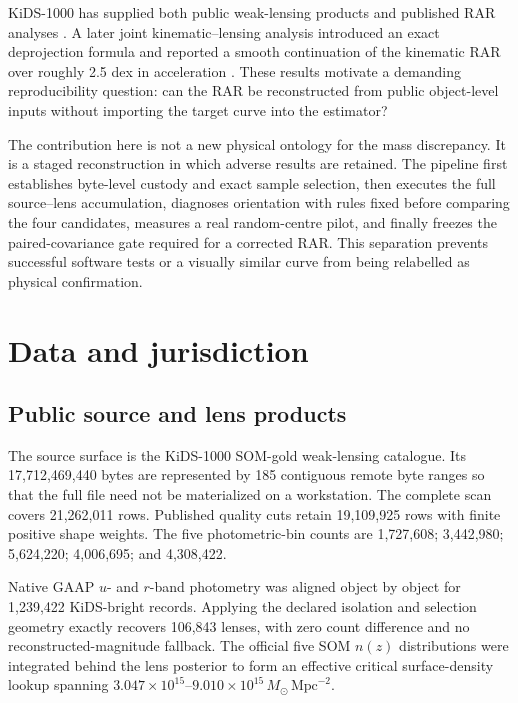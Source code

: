 \documentclass[11pt]{article}
\begin{document}
KiDS-1000 has supplied both public weak-lensing products and published RAR
analyses \citep{Kuijken2019,Wright2020,Brouwer2021}. A later joint
kinematic--lensing analysis introduced an exact deprojection formula and
reported a smooth continuation of the kinematic RAR over roughly 2.5 dex in
acceleration \citep{Mistele2024}. These results motivate a demanding
reproducibility question: can the RAR be reconstructed from public object-level
inputs without importing the target curve into the estimator?

The contribution here is not a new physical ontology for the mass discrepancy.
It is a staged reconstruction in which adverse results are retained. The
pipeline first establishes byte-level custody and exact sample selection, then
executes the full source--lens accumulation, diagnoses orientation with rules
fixed before comparing the four candidates, measures a real random-centre
pilot, and finally freezes the paired-covariance gate required for a corrected
RAR. This separation prevents successful software tests or a visually similar
curve from being relabelled as physical confirmation.

\section{Data and jurisdiction}

\subsection{Public source and lens products}

The source surface is the KiDS-1000 SOM-gold weak-lensing catalogue. Its
17,712,469,440 bytes are represented by 185 contiguous remote byte ranges so
that the full file need not be materialized on a workstation. The complete
scan covers 21,262,011 rows. Published quality cuts retain 19,109,925 rows with
finite positive shape weights. The five photometric-bin counts are
1,727,608; 3,442,980; 5,624,220; 4,006,695; and 4,308,422.

Native GAAP $u$- and $r$-band photometry was aligned object by object for
1,239,422 KiDS-bright records. Applying the declared isolation and selection
geometry exactly recovers 106,843 lenses, with zero count difference and no
reconstructed-magnitude fallback. The official five SOM $n(z)$ distributions
were integrated behind the lens posterior to form an effective critical
surface-density lookup spanning
$3.047\times10^{15}$--$9.010\times10^{15}\,M_\odot\,\mathrm{Mpc}^{-2}$.
\end{document}
